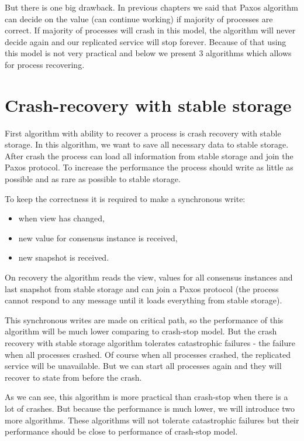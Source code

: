 But there is one big drawback. In previous chapters we said that Paxos algorithm can decide on the value (can continue working) if majority of processes are correct. If majority of processes will crash in this model, the algorithm will never decide again and our replicated service will stop forever. Because of that using this model is not very practical and below we present 3 algorithms which allows for process recovering.

\section{Crash-recovery with stable storage}
\label{sec:full_ss}

First algorithm with ability to recover a process is crash recovery with stable storage. In this algorithm, we want to save all necessary data to stable storage. After crash the process can load all information from stable storage and join the Paxos protocol. To increase the performance the process should write as little as possible and as rare as possible to stable storage.

To keep the correctness it is required to make a synchronous write:
\begin{itemize}
  \item when view has changed,
  \item new value for consensus instance is received,
  \item new snapshot is received.
\end{itemize}

On recovery the algorithm reads the view, values for all consensus instances and last snapshot from stable storage and can join a Paxos protocol (the process cannot respond to any message until it loads everything from stable storage).

This synchronous writes are made on critical path, so the performance of this algorithm will be much lower comparing to crash-stop model. But the crash recovery with stable storage algorithm tolerates catastrophic failures - the failure when all processes crashed. Of course when all processes crashed, the replicated service will be unavailable. But we can start all processes again and they will recover to state from before the crash.

As we can see, this algorithm is more practical than crash-stop when there is a lot of crashes. But because the performance is much lower, we will introduce two more algorithms. These algorithms will not tolerate catastrophic failures but their performance should be close to performance of crash-stop model.

